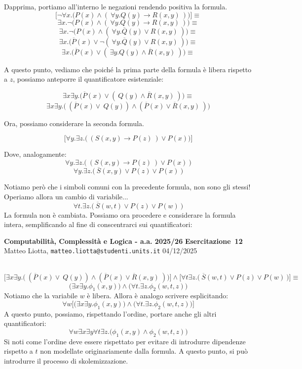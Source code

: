 \documentclass[a4paper,10pt]{article}
\makeatletter
\newcommand{\EsercitazioneNum}{12}
\newcommand{\Data}{04/12/2025}
\newcommand{\DocType}{Esercitazione} %
\newcommand{\FullTitle}{\DocType\ \EsercitazioneNum}
\newcommand{\Header}{
\noindent
  \small \textbf{Computabilità, Complessità e Logica - a.a. 2025/26} \hfill \textbf{\FullTitle} \\[0.2cm]
  \scriptsize Matteo Liotta, \texttt{matteo.liotta@studenti.units.it} \hfill \Data \\[0.2cm]
  \noindent\makebox[\linewidth]{\rule{\linewidth}{0.4pt}} \\[0.3cm]}
\newcommand{\NewPageHeader}{
  \vfill
  \noindent\makebox[\linewidth]{\rule{\linewidth}{0.4pt}}
  \newpage
  {\Header}
}
\makeatother
\begin{document}
{\begin{itemize}[label=, leftmargin=0pt]
\begin{osservazioni}
    Dapprima, portiamo all'interno le negazioni rendendo positiva la formula. 
    $$\bigg[ \lnot \forall x.\bigg( P(x)\land (\ \forall y. Q(y)\rightarrow R(x,y)\ )\bigg)\bigg]\equiv$$
    $$\exists x.\lnot\bigg( P(x)\land (\ \forall y. Q(y)\rightarrow R(x,y)\ )\bigg)\equiv$$
    $$\exists x.\lnot\bigg( P(x)\land (\ \forall y. \overline Q(y)\lor R(x,y)\ )\bigg)\equiv$$
    $$\exists x.\bigg( \overline P(x)\lor \lnot (\ \forall y. \overline Q(y)\lor R(x,y)\ )\bigg)\equiv$$
    $$\exists x.\bigg( \overline P(x)\lor (\ \exists y. Q(y)\land \overline R(x,y)\ )\bigg)\equiv$$

    A questo punto, vediamo che poiché la prima parte della formula è libera rispetto a $z$, possiamo anteporre il quantificatore esistenziale:

    $$\exists x\exists y.\bigg( \overline P(x)\lor (\ Q(y)\land \overline R(x,y)\ )\bigg)\equiv$$
    $$\exists x\exists y.\bigg(\ ( \overline P(x)\lor\ Q(y))\land (\overline P(x)\lor \overline R(x,y)\ )\bigg)$$

    Ora, possiamo considerare la seconda formula. 

    $$\bigg[\forall y.\exists z.\bigg(\ (S(x,y)\rightarrow P(z)\ )\lor P(x)\bigg)\bigg]$$

    Dove, analogamente:
    $$\forall y.\exists z.\bigg(\ (S(x,y)\rightarrow P(z)\ )\lor P(x)\ \bigg)$$
    $$\forall y.\exists z.\bigg(\ \overline S(x,y)\lor P(z)\lor P(x)\ \bigg)$$

    Notiamo però che i simboli comuni con la precedente formula, non sono gli stessi! Operiamo allora un cambio di variabile...
    $$\forall t.\exists z.\bigg(\ \overline S(w,t)\lor P(z)\lor P(w)\ \bigg)$$
    La formula non è cambiata. Possiamo ora procedere e considerare la formula intera, semplificando al fine di conscentrarci sui quantificatori:



    
    \end{osservazioni}
    \NewPageHeader
    \begin{osservazioni}
    $$\bigg[\exists x\exists y.\bigg(\ ( \overline P(x)\lor\ Q(y))\land (\overline P(x)\lor \overline R(x,y)\ )\bigg)\bigg]\land \bigg[\forall t\exists z.\bigg(\ \overline S(w,t)\lor P(z)\lor P(w)\ \bigg)\bigg]\equiv$$
    $$\bigg(\exists x\exists y.\phi_1(x,y)\bigg) \land \bigg( \forall t.\exists z. \phi_2(w,t,z)\bigg)$$
    Notiamo che la variabile $w$ è libera. Allora è analogo scrivere esplicitando:
    $$\forall w \bigg[\bigg(\exists x\exists y.\phi_1(x,y)\bigg) \land \bigg( \forall t.\exists z. \phi_2(w,t,z)\bigg)\bigg]$$
    A questo punto, possiamo, rispettando l'ordine, portare anche gli altri quantificatori:
    $$\forall w \exists x\exists y\forall t\exists z.\bigg(\phi_1(x,y) \land \phi_2(w,t,z)\bigg)$$
    Si noti come l'ordine deve essere rispettato per evitare di introdurre dipendenze rispetto a $t$ non modellate originariamente dalla formula. A questo punto, si può introdurre il processo di skolemizzazione.\\


\end{osservazioni}
\end{itemize}}
\end{document}

